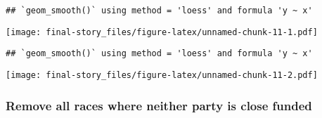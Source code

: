 \documentclass[
]{article}
\newenvironment{Shaded}{\begin{snugshade}}{\end{snugshade}}
\newcommand{\DataTypeTok}[1]{\textcolor[rgb]{0.13,0.29,0.53}{#1}}
\newcommand{\DecValTok}[1]{\textcolor[rgb]{0.00,0.00,0.81}{#1}}
\newcommand{\KeywordTok}[1]{\textcolor[rgb]{0.13,0.29,0.53}{\textbf{#1}}}
\newcommand{\NormalTok}[1]{#1}
\newcommand{\OperatorTok}[1]{\textcolor[rgb]{0.81,0.36,0.00}{\textbf{#1}}}
\newcommand{\StringTok}[1]{\textcolor[rgb]{0.31,0.60,0.02}{#1}}
\begin{document}
\begin{verbatim}
## `geom_smooth()` using method = 'loess' and formula 'y ~ x'
\end{verbatim}

\texttt{[image: final-story\_files/figure-latex/unnamed-chunk-11-1.pdf]}

\begin{Shaded}
\end{Shaded}

\begin{verbatim}
## `geom_smooth()` using method = 'loess' and formula 'y ~ x'
\end{verbatim}

\texttt{[image: final-story\_files/figure-latex/unnamed-chunk-11-2.pdf]}

\hypertarget{remove-all-races-where-neither-party-is-close-funded}{%
\subsubsection{Remove all races where neither party is close
funded}\label{remove-all-races-where-neither-party-is-close-funded}}
\end{document}
